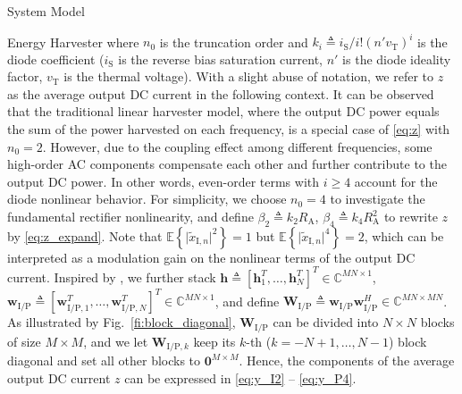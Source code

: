 \documentclass[journal]{IEEEtran}
\begin{document}
\begin{section}{System Model}
\begin{subsection}{Energy Harvester}
			where $n_0$ is the truncation order and $k_i \triangleq i_{\mathrm{S}}/i!(n'v_{\mathrm{T}})^i$ is the diode coefficient ($i_{\mathrm{S}}$ is the reverse bias saturation current, $n'$ is the diode ideality factor, $v_{\mathrm{T}}$ is the thermal voltage). With a slight abuse of notation, we refer to $z$ as the average output DC current in the following context. It can be observed that the traditional linear harvester model, where the output DC power equals the sum of the power harvested on each frequency, is a special case of \eqref{eq:z} with $n_0=2$. However, due to the coupling effect among different frequencies, some high-order AC components compensate each other and further contribute to the output DC power. In other words, even-order terms with $i \ge 4$ account for the diode nonlinear behavior. For simplicity, we choose $n_0=4$ to investigate the fundamental rectifier nonlinearity, and define $\beta_2 \triangleq {k_2}{R_{\mathrm{A}}}$, $\beta_4 \triangleq {k_4}{R_{\mathrm{A}}^2}$ to rewrite $z$ by \eqref{eq:z_expand}. Note that $\mathbb{E}\left\{\lvert\tilde{x}_{\mathrm{I},n}\rvert^2\right\}=1$ but $\mathbb{E}\left\{\lvert\tilde{x}_{\mathrm{I},n}\rvert^4\right\}=2$, which can be interpreted as a modulation gain on the nonlinear terms of the output DC current. Inspired by \cite{Huang2017}, we further stack $\boldsymbol{h} \triangleq [\boldsymbol{h}_1^T,\dots,\boldsymbol{h}_N^T]^T \in \mathbb{C}^{MN \times 1}$, $\boldsymbol{w}_{\mathrm{I/P}} \triangleq [\boldsymbol{w}_{\mathrm{I/P},1}^T,\dots,\boldsymbol{w}_{\mathrm{I/P},N}^T]^T \in \mathbb{C}^{MN \times 1}$, and define $\boldsymbol{W}_{\mathrm{I/P}} \triangleq \boldsymbol{w}_{\mathrm{I/P}}\boldsymbol{w}_{\mathrm{I/P}}^H \in \mathbb{C}^{MN \times MN}$. As illustrated by Fig.~\ref{fi:block_diagonal}, $\boldsymbol{W}_{\mathrm{I/P}}$ can be divided into $N \times N$ blocks of size $M \times M$, and we let $\boldsymbol{W}_{\mathrm{I/P},k}$ keep its $k$-th ($k=-N+1,\dots,N-1$) block diagonal and set all other blocks to $\boldsymbol{0}^{M \times M}$. Hence, the components of the average output DC current $z$ can be expressed in \eqref{eq:y_I2} -- \eqref{eq:y_P4}.


\end{subsection}
\end{section}
\end{document}
